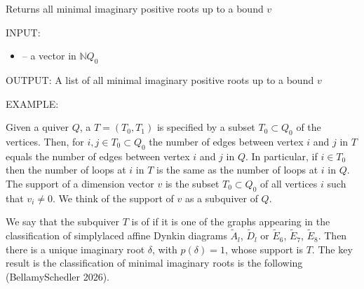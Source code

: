 \documentclass[letterpaper,10pt,english]{sphinxmanual}
\begin{document}
\begin{fulllineitems}
\label{\detokenize{index:quivercombinatorics.quivercombinatorics.Quiver.all_minimal_imaginary_positive_roots}}
\pysigstartsignatures
\pysiglinewithargsret
{}
{}
{}
\pysigstopsignatures
\sphinxAtStartPar
Returns all minimal imaginary positive roots up to a bound \(v\)

\sphinxAtStartPar
INPUT:
\begin{itemize}
\item {} 
\sphinxAtStartPar
{} – a vector in \(\mathbb{N}Q_0\)

\end{itemize}

\sphinxAtStartPar
OUTPUT: A list of all minimal imaginary positive roots up to a bound \(v\)

\sphinxAtStartPar
EXAMPLE:

\begin{sphinxVerbatim}[commandchars=\\\{\}]
  
   
  
\PYG{p}{[} \PYG{p}{]}
\end{sphinxVerbatim}

\end{fulllineitems}


\sphinxAtStartPar
Given a quiver \(Q\), a  \(T = (T_0, T_1)\) is specified by a subset \(T_0\subset Q_0\) of the vertices. Then, for \(i, j \in T_0 \subset Q_0\) the number of edges between vertex \(i\) and \(j\) in \(T\) equals the number of edges between vertex \(i\) and \(j\) in \(Q\). In particular, if \(i\in T_0\) then the number of loops at \(i\) in \(T\) is the same as the number of loops at \(i\) in \(Q\). The support of a dimension vector \(v\) is the subset \(T_0 \subset Q_0\) of all vertices \(i\) such that \(v_i\neq 0\). We think of the support of \(v\) as a subquiver of \(Q\).

\sphinxAtStartPar
We say that the subquiver \(T\) is of  if it is one of the graphs appearing in the classification of simply\sphinxhyphen{}laced affine Dynkin diagrams \(\tilde{A}_l\), \(\tilde{D}_l\) or \(\tilde{E}_6\), \(\tilde{E}_7\), \(\tilde{E}_8\). Then there is a unique imaginary root \(\delta\), with \(p(\delta)=1\), whose support is \(T\). The key result is the classification of minimal imaginary roots is the following (Bellamy\sphinxhyphen{}Schedler 2026).
\end{document}
